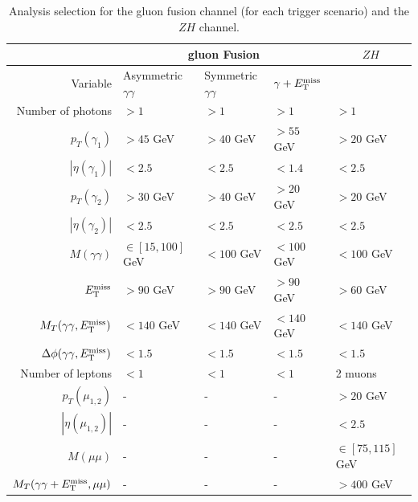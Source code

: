 \begin{table}[]
\centering
\begin{tabular}{| r | l | l | l| l|}
\hline
 & \multicolumn{3}{|c|}{gluon Fusion} & \multicolumn{1}{|c|}{$ZH$} \\ 
\hline
Variable & Asymmetric $\gamma\gamma $& Symmetric $\gamma\gamma$ & $\gamma+E_{\mathrm{T}}^{\text{miss}}$ & \\ \hline
Number of photons       & $> 1$         & $> 1$         & $> 1$         & $> 1$\\
$p_{T}(\gamma_{1})$     & $ > 45$ GeV   & $ > 40$ GeV   & $ > 55$ GeV   & $ > 20$ GeV\\
$|\eta(\gamma_{1})|$    & $ < 2.5$      & $ < 2.5$      & $ < 1.4$      & $< 2.5$ \\
$p_{T}(\gamma_{2})$     & $ > 30$ GeV   & $ > 40$ GeV   & $ > 20$ GeV   & $ > 20$ GeV\\
$|\eta(\gamma_{2})|$    & $ < 2.5$      & $ < 2.5$      & $ < 2.5$      & $ < 2.5$ \\
$M(\gamma\gamma)$       & $\in [15, 100]$ GeV & $< 100$ GeV & $< 100$ GeV & $< 100$ GeV \\
$E_{\mathrm{T}}^{\text{miss}}$                  & $> 90$ GeV    & $> 90$ GeV    & $> 90$ GeV    & $> 60$ GeV \\
$M_{T}(\gamma\gamma,E_{\mathrm{T}}^{\text{miss}})$                    & $< 140$ GeV   & $< 140$ GeV   & $< 140$ GeV   & $< 140$ GeV \\
$\Delta\phi(\gamma\gamma,E_{\mathrm{T}}^{\text{miss}})$ & $< 1.5$ & $< 1.5$ & $< 1.5$ & $< 1.5$ \\
Number of leptons       & $< 1$         & $< 1$         & $< 1$         & 2 muons \\
\hline
$p_{T}(\mu_{1,2})$ & -  & - & - & $ > 20$ GeV \\
$|\eta(\mu_{1,2})|$ & - & - & - & $ < 2.5$ \\
$M(\mu\mu)$ & - & - & - & $\in [75,115]$ GeV\\
$M_{T}(\gamma\gamma+E_{\mathrm{T}}^{\text{miss}}, \mu\mu)$ & - & - & - & $> 400$ GeV\\
\hline
\end{tabular}
\caption{Analysis selection for the gluon fusion channel (for each trigger scenario) and the $ZH$ channel.}
\label{tab:sel_all}
\end{table}

